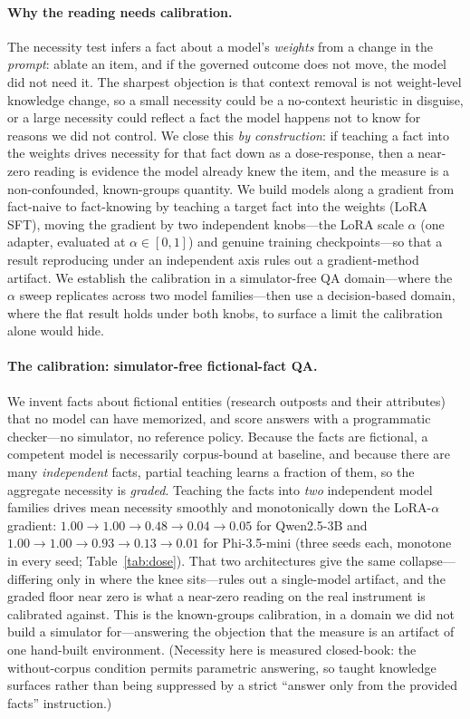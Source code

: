 \documentclass{article}
\begin{document}
\paragraph{Why the reading needs calibration.} The necessity test infers a fact about a model's
\emph{weights} from a change in the \emph{prompt}: ablate an item, and if the governed outcome does not
move, the model did not need it. The sharpest objection is that context removal is not weight-level
knowledge change, so a small necessity could be a no-context heuristic in disguise, or a large
necessity could reflect a fact the model happens not to know for reasons we did not control. We close
this \emph{by construction}: if teaching a fact into the weights drives necessity for that fact down as
a dose-response, then a near-zero reading is evidence the model already knew the item, and the measure
is a non-confounded, known-groups quantity. We build models along a gradient from fact-naive to
fact-knowing by teaching a target fact into the weights (LoRA SFT), moving the gradient by two
independent knobs---the LoRA scale $\alpha$ (one adapter, evaluated at $\alpha\in[0,1]$) and genuine
training checkpoints---so that a result reproducing under an independent axis rules out a
gradient-method artifact. We establish the calibration in a simulator-free QA domain---where the
$\alpha$ sweep replicates across two model families---then use a decision-based domain, where the flat
result holds under both knobs, to surface a limit the calibration alone would hide.

\paragraph{The calibration: simulator-free fictional-fact QA.} We invent facts about fictional entities
(research outposts and their attributes) that no model can have memorized, and score answers with a
programmatic checker---no simulator, no reference policy. Because the facts are fictional, a competent
model is necessarily corpus-bound at baseline, and because there are many \emph{independent} facts,
partial teaching learns a fraction of them, so the aggregate necessity is \emph{graded}. Teaching the
facts into \emph{two} independent model families drives mean necessity smoothly and monotonically down
the LoRA-$\alpha$ gradient: $1.00\!\to\!1.00\!\to\!0.48\!\to\!0.04\!\to\!0.05$ for Qwen2.5-3B and
$1.00\!\to\!1.00\!\to\!0.93\!\to\!0.13\!\to\!0.01$ for Phi-3.5-mini (three seeds each, monotone in every
seed; Table~\ref{tab:dose}). That two architectures give the same collapse---differing only in where
the knee sits---rules out a single-model artifact, and the graded floor near zero is what a near-zero
reading on the real instrument is calibrated against. This is the known-groups calibration, in a domain we did not
build a simulator for---answering the objection that the measure is an artifact of one hand-built
environment. (Necessity here is measured closed-book: the without-corpus condition permits parametric
answering, so taught knowledge surfaces rather than being suppressed by a strict ``answer only from the
provided facts'' instruction.)
\end{document}
